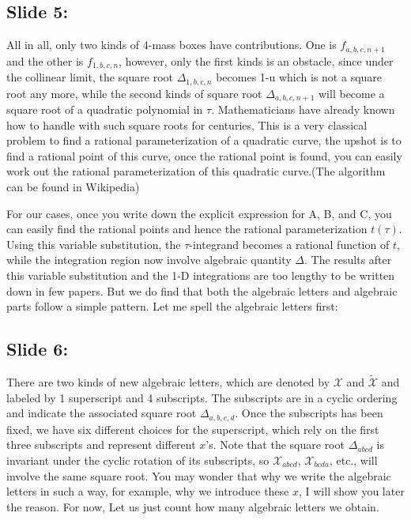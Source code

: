\documentclass[a4paper,11pt]{article}
\begin{document}
\subsection{Slide 5:}

All in all, only two kinds of 4-mass boxes have contributions. One is $f_{a,b,c,n+1}$ and the other is $f_{1,b,c,n}$, however, only the first kinds is an obstacle, since under the collinear limit, the square root $\Delta_{1,b,c,n}$ becomes 1-u which is not a square root any more, while the second kinds of square root $\Delta_{a,b,c,n+1}$ will become a square root of a quadratic polynomial in $\tau$. Mathematicians have already known how to handle with such square roots for centuries,  This is a very classical problem to find a rational parameterization of a quadratic curve, the upshot is to find a rational point of this curve, once the rational point is found, you can easily work out the rational parameterization of this quadratic curve.(The algorithm can be found in Wikipedia)

For our cases, once you write down the explicit expression for A, B, and C, you can easily find the rational points and hence the rational parameterization $t(\tau)$. Using this variable substitution, the $\tau$-integrand becomes a rational function of $t$, while the integration region now involve algebraic quantity $\Delta$. The results after this variable substitution and the 1-D integrations are too lengthy to be written down in few papers. But we do find that both the algebraic letters and algebraic parts follow a simple pattern. Let me spell the algebraic letters first:

\subsection{Slide 6:}

There are two kinds of new algebraic letters, which are denoted by $\mathcal{X}$ and $\tilde{\mathcal{X}}$ and labeled by 1 superscript and 4 subscripts. The subscripts are in a cyclic ordering and indicate the associated square root $\Delta_{a,b,c,d}$. Once the subscripts has been fixed, we have six different choices for the superscript, which rely on the first three subscripts and represent different $x$'s. Note that the square root $\Delta_{abcd}$ is invariant under the cyclic rotation of its subscripts,  so $\mathcal{X}_{abcd}$, $\mathcal{X}_{bcda}$, etc., will involve the same square root. You may wonder that why we write the algebraic letters in such a way, for example, why we introduce these $x$,  I will show you later the reason. For now, Let us just count how many algebraic letters we obtain. 
\end{document}

